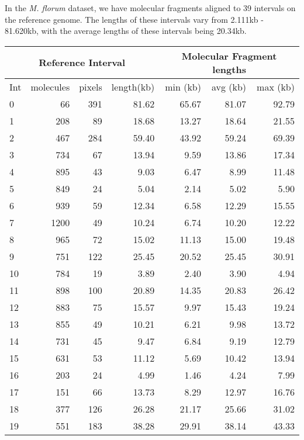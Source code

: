 In the {\emph{M. florum}} dataset, we have molecular fragments aligned to 39 intervals on the reference genome. The lengths of these intervals vary from 2.111kb - 81.620kb, with the average lengths of these intervals being 20.34kb. 
\begin{table}[H]
\centering
\begin{tabular}{lrrr|rrr}
  \hline
  \hline
  \multicolumn{4}{c}{Reference Interval} & \multicolumn{3}{c}{Molecular Fragment lengths} \\
  \hline
   Int  & molecules & pixels & length(kb) & min (kb) & avg (kb) & max (kb)\\ 
  \hline
  \hline
    0 &  66 & 391 & 81.62 & 65.67 & 81.07 & 92.79 \\ 
    1 & 208 & 89 & 18.68 & 13.27 & 18.64 & 21.55 \\ 
    2 & 467 & 284 & 59.40 & 43.92 & 59.24 & 69.39 \\ 
    3 & 734 & 67 & 13.94 & 9.59 & 13.86 & 17.34 \\ 
    4 & 895 & 43 & 9.03 & 6.47 & 8.99 & 11.48 \\ 
    5 & 849 & 24 & 5.04 & 2.14 & 5.02 & 5.90 \\ 
    6 & 939 & 59 & 12.34 & 6.58 & 12.29 & 15.55 \\ 
    7 & 1200 & 49 & 10.24 & 6.74 & 10.20 & 12.22 \\ 
    8 & 965 & 72 & 15.02 & 11.13 & 15.00 & 19.48 \\ 
    9 & 751 & 122 & 25.45 & 20.52 & 25.45 & 30.91 \\ 
   10 & 784 & 19 & 3.89 & 2.40 & 3.90 & 4.94 \\ 
   11 & 898 & 100 & 20.89 & 14.35 & 20.83 & 26.42 \\ 
   12 & 883 & 75 & 15.57 & 9.97 & 15.43 & 19.24 \\ 
   13 & 855 & 49 & 10.21 & 6.21 & 9.98 & 13.72 \\ 
   14 & 731 & 45 & 9.47 & 6.84 & 9.19 & 12.79 \\ 
   15 & 631 & 53 & 11.12 & 5.69 & 10.42 & 13.94 \\ 
   16 & 203 & 24 & 4.99 & 1.46 & 4.24 & 7.99 \\ 
   17 & 151 & 66 & 13.73 & 8.29 & 12.97 & 16.76 \\ 
   18 & 377 & 126 & 26.28 & 21.17 & 25.66 & 31.02 \\ 
   19 & 551 & 183 & 38.28 & 29.91 & 38.14 & 43.33 \\ 

\end{tabular}
\end{table}
